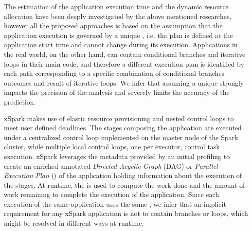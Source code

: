 The estimation of the application execution time and the dynamic resource allocation have been deeply investigated by the above mentioned researches, however all the proposed approaches is based on the assumption that the application execution is governed by a unique \plan, i.e. tha plan is defined at the application start time and cannot change during its execution. 
Applications in the real world, on the other hand, can contain conditional branches and iterative loops in their main code, and therefore a different execution plan is identified by each path corresponding to a specific combination of conditional branches outcomes and result of iterative loops. We infer that assuming a unique \plan strongly impacts the precision of the analysis and severely limits the accuracy of the prediction. 

xSpark makes use of elastic resource provisioning and nested control loops to meet user defined deadlines. The stages composing the application are executed under a centralized control loop implemented on the master node of the Spark cluster, while multiple local control loops, one per executor, control task execution. xSpark leverages the metadata provided by an initial profiling to create an enriched annotated \textit{Directed Acyclic Graph} (DAG) or \textit{Parallel Execution Plan} (\plan) of the application holding information about the execution of the stages. At runtime, the \plan is used to compute the work done and the amount of work remaining to complete the execution of the application. Since each execution of the same application uses the same \plan, we infer that an implicit requirement for any xSpark application is not to contain branches or loops, which might be resolved in different ways at runtime.


